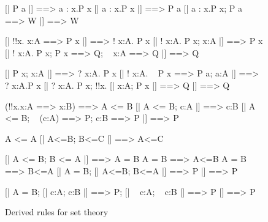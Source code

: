 \begin{figure} \underscoreon
\begin{ttbox}
        [| P a |] ==> a : {\ttlbrace}x.P x{\ttrbrace}
        [| a : {\ttlbrace}x.P x{\ttrbrace} |] ==> P a
        [| a : {\ttlbrace}x.P x{\ttrbrace};  P a ==> W |] ==> W

           [| !!x. x:A ==> P x |] ==> ! x:A. P x
           [| ! x:A. P x;  x:A |] ==> P x
           [| ! x:A. P x;  P x ==> Q;  ~ x:A ==> Q |] ==> Q

            [| P x;  x:A |] ==> ? x:A. P x
           [| ! x:A. ~ P x ==> P a;  a:A |] ==> ? x:A.P x
            [| ? x:A. P x;  !!x. [| x:A; P x |] ==> Q  |] ==> Q

         (!!x.x:A ==> x:B) ==> A <= B
         [| A <= B;  c:A |] ==> c:B
        [| A <= B;  ~ (c:A) ==> P;  c:B ==> P |] ==> P

     A <= A
    [| A<=B;  B<=C |] ==> A<=C

       [| A <= B;  B <= A |] ==> A = B
      A = B ==> A<=B
      A = B ==> B<=A
       [| A = B;  [| A<=B; B<=A |] ==> P |]  ==>  P

      [| A = B;  [| c:A; c:B |] ==> P;  
                           [| ~ c:A; ~ c:B |] ==> P 
                |]  ==>  P
\end{ttbox}
\caption{Derived rules for set theory} \label{hol-set1}
\end{figure}



